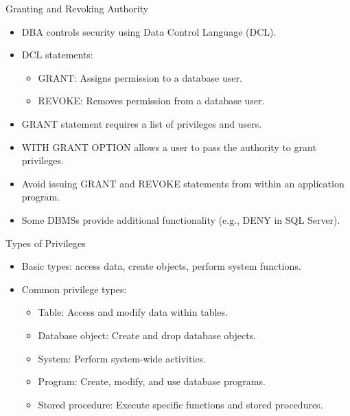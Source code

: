 \documentclass{beamer}
\begin{document}
\begin{frame}{Granting and Revoking Authority}
  \begin{itemize}
    \item DBA controls security using Data Control Language (DCL).
    \item DCL statements:
      \begin{itemize}
        \item GRANT: Assigns permission to a database user.
        \item REVOKE: Removes permission from a database user.
      \end{itemize}
    \item GRANT statement requires a list of privileges and users.
    \item WITH GRANT OPTION allows a user to pass the authority to grant privileges.
    \item Avoid issuing GRANT and REVOKE statements from within an application program.
    \item Some DBMSs provide additional functionality (e.g., DENY in SQL Server).
  \end{itemize}
\end{frame}

\begin{frame}{Types of Privileges}
  \begin{itemize}
    \item Basic types: access data, create objects, perform system functions.
    \item Common privilege types:
      \begin{itemize}
        \item Table: Access and modify data within tables.
        \item Database object: Create and drop database objects.
        \item System: Perform system-wide activities.
        \item Program: Create, modify, and use database programs.
        \item Stored procedure: Execute specific functions and stored procedures.
      \end{itemize}
  \end{itemize}
\end{frame}
\end{document}
